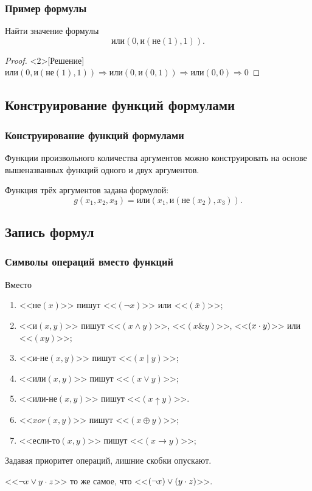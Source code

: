 \begin{frame}
    \frametitle{Пример формулы}
    
    \begin{example}[Задача] 
        Найти значение формулы 
        \[
            \textit{или}(0,\textit{и}(\textit{не}(1), 1)).
        \]
    \end{example}
    \begin{proof}<2>[Решение] 
        \(
            \textit{или}(0,\textit{и}(\textit{не}(1), 1))\Rightarrow
            \textit{или}(0,\textit{и}(0, 1))\Rightarrow
            \textit{или}(0,0)\Rightarrow 0
        \)
    \end{proof}
\end{frame}


\subsection{Конструирование функций формулами}

\begin{frame}
    \frametitle{Конструирование функций формулами}
    
    Функции произвольного количества аргументов можно конструировать на основе вышеназванных функций одного и двух аргументов. 
    \begin{example} 
        Функция трёх аргументов задана формулой:
        \[
            g(x_1,x_2,x_3)=\textit{или}(x_1,\textit{и}(\textit{не}(x_2), x_3)).
        \]
    \end{example}
\end{frame}


\subsection{Запись формул}

\begin{frame}
    \frametitle{Символы операций вместо функций}
    
    Вместо
    \begin{enumerate}
        \item{} <<$\textit{не}(x)$>> пишут <<$(\lnot x)$>> или <<$(\bar{x})$>>;
        \item{} <<$\textit{и}(x,y)$>> пишут <<$(x \land y)$>>, <<$(x \& y)$>>,  <<$(x \cdot y)$>> или  <<$(xy)$>>;
        \item{} <<$\textit{и-не}(x,y)$>> пишут <<$(x \mid y)$>>;
        \item{} <<$\textit{или}(x,y)$>> пишут <<$(x \lor y)$>>;
        \item{} <<$\textit{или-не}(x,y)$>> пишут <<$(x \uparrow y)$>>.
        \item{} <<$\textit{xor}(x,y)$>> пишут <<$(x \oplus y)$>>;
        \item{} <<$\textit{если-то}(x,y)$>> пишут <<$(x \to y)$>>;
    \end{enumerate}

    Задавая приоритет операций, лишние скобки опускают.
    \begin{example} 
        {}<<$\lnot x\lor y\cdot z$>> то же самое, что <<$(\lnot x)\lor (y\cdot z)$>>.
    \end{example}
\end{frame}

